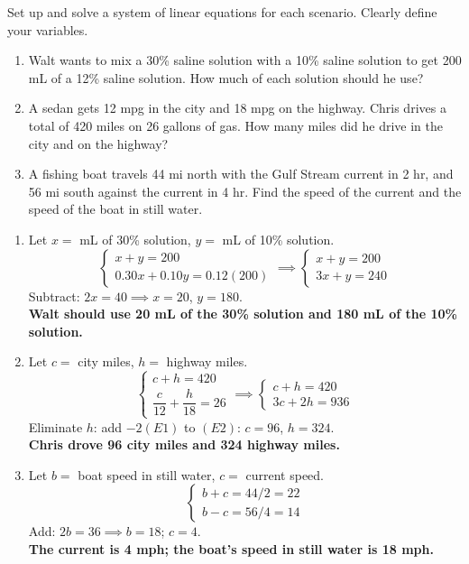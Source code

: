 \documentclass{ximera}
\begin{document}
\begin{problem}
Set up and solve a system of linear equations for each scenario. Clearly define your variables.
\begin{enumerate}
  \item[(a)] Walt wants to mix a 30\% saline solution with a 10\% saline solution to get 200 mL of a 12\% saline solution. How much of each solution should he use?
  \medskip
  \item[(b)] A sedan gets 12 mpg in the city and 18 mpg on the highway. Chris drives a total of 420 miles on 26 gallons of gas. How many miles did he drive in the city and on the highway?
  \medskip
  \item[(c)] A fishing boat travels 44 mi north with the Gulf Stream current in 2 hr, and 56 mi south against the current in 4 hr. Find the speed of the current and the speed of the boat in still water.
\end{enumerate}

\begin{solution}
\begin{enumerate}
  \item[(a)] Let $x=$ mL of 30\% solution, $y=$ mL of 10\% solution.
  $$\begin{cases} x+y=200 \\ 0.30x+0.10y=0.12(200) \end{cases} \implies \begin{cases} x+y=200 \\ 3x+y=240 \end{cases}$$
  Subtract: $2x=40 \implies x=20$, $y=180$.\\
  \textbf{Walt should use 20 mL of the 30\% solution and 180 mL of the 10\% solution.}

  \item[(b)] Let $c=$ city miles, $h=$ highway miles.
  $$\begin{cases} c+h=420 \\ \dfrac{c}{12}+\dfrac{h}{18}=26 \end{cases} \implies \begin{cases} c+h=420 \\ 3c+2h=936 \end{cases}$$
  Eliminate $h$: add $-2(E1)$ to $(E2)$: $c=96$, $h=324$.\\
  \textbf{Chris drove 96 city miles and 324 highway miles.}

  \item[(c)] Let $b=$ boat speed in still water, $c=$ current speed.
  $$\begin{cases} b+c=44/2=22 \\ b-c=56/4=14 \end{cases}$$
  Add: $2b=36 \implies b=18$; $c=4$.\\
  \textbf{The current is 4 mph; the boat's speed in still water is 18 mph.}
\end{enumerate}
\end{solution}
\end{problem}
\end{document}
